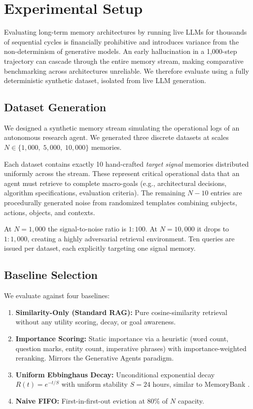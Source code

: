 \documentclass[conference]{IEEEtran}
\begin{document}
\section{Experimental Setup}
\label{sec:experiments}

Evaluating long-term memory architectures by running live LLMs for thousands of sequential cycles is financially prohibitive and introduces variance from the non-determinism of generative models. An early hallucination in a 1,000-step trajectory can cascade through the entire memory stream, making comparative benchmarking across architectures unreliable. We therefore evaluate using a fully deterministic synthetic dataset, isolated from live LLM generation.

\subsection{Dataset Generation}
We designed a synthetic memory stream simulating the operational logs of an autonomous research agent. We generated three discrete datasets at scales $N \in \{1{,}000,\; 5{,}000,\; 10{,}000\}$ memories.

Each dataset contains exactly 10 hand-crafted \textit{target signal} memories distributed uniformly across the stream. These represent critical operational data that an agent must retrieve to complete macro-goals (e.g., architectural decisions, algorithm specifications, evaluation criteria). The remaining $N{-}10$ entries are procedurally generated noise from randomized templates combining subjects, actions, objects, and contexts.

At $N{=}1{,}000$ the signal-to-noise ratio is $1{:}100$. At $N{=}10{,}000$ it drops to $1{:}1{,}000$, creating a highly adversarial retrieval environment. Ten queries are issued per dataset, each explicitly targeting one signal memory.

\subsection{Baseline Selection}
We evaluate against four baselines:
\begin{enumerate}
    \item \textbf{Similarity-Only (Standard RAG):} Pure cosine-similarity retrieval without any utility scoring, decay, or goal awareness.
    \item \textbf{Importance Scoring:} Static importance via a heuristic (word count, question marks, entity count, imperative phrases) with importance-weighted reranking. Mirrors the Generative Agents \cite{park2023generative} paradigm.
    \item \textbf{Uniform Ebbinghaus Decay:} Unconditional exponential decay $R(t) = e^{-t/S}$ with uniform stability $S{=}24$ hours, similar to MemoryBank \cite{zhong2023memorybank}.
    \item \textbf{Naive FIFO:} First-in-first-out eviction at 80\% of $N$ capacity.
\end{enumerate}
\end{document}
